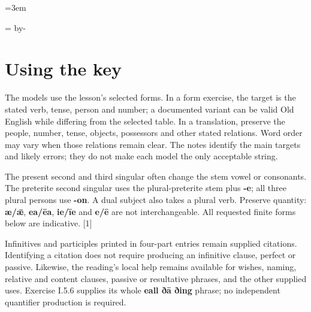 \BookRecto
\begingroup
\renewcommand{\runningtitle}{Unit 5. Answer key}
\emergencystretch=3em
\newcommand{\itempara}[2]{\par\addvspace{3pt}\noindent\hangindent=1.8em\hangafter=1\makebox[1.8em][l]{#1.}#2\par}
\newcommand{\reserve}[1]{\par\penalty-100\begingroup\dimen0=\pagegoal\advance\dimen0 by-\pagetotal\ifdim\dimen0<#1\newpage\fi\endgroup}

\raggedright
{}

\reserve{7\baselineskip}
\section*{Using the key}

The models use the lesson's selected forms. In a form exercise, the target is the stated verb, tense, person and number; a documented variant can be valid Old English while differing from the selected table. In a translation, preserve the people, number, tense, objects, possessors and other stated relations. Word order may vary when those relations remain clear. The notes identify the main targets and likely errors; they do not make each model the only acceptable string.

The present second and third singular often change the stem vowel or consonants. The preterite second singular uses the plural-preterite stem plus \textbf{-e}; all three plural persons use \textbf{-on}. A dual subject also takes a plural verb. Preserve quantity: \textbf{æ/\allowbreak{}ǣ}, \textbf{ea/\allowbreak{}ēa}, \textbf{ie/\allowbreak{}īe} and \textbf{e/\allowbreak{}ē} are not interchangeable. All requested finite forms below are indicative. [1]

Infinitives and participles printed in four-part entries remain supplied citations. Identifying a citation does not require producing an infinitive clause, perfect or passive. Likewise, the reading's local help remains available for wishes, naming, relative and content clauses, passive or resultative phrases, and the other supplied uses. Exercise I.5.6 supplies its whole \textbf{eall ðā ðing} phrase; no independent quantifier production is required.

